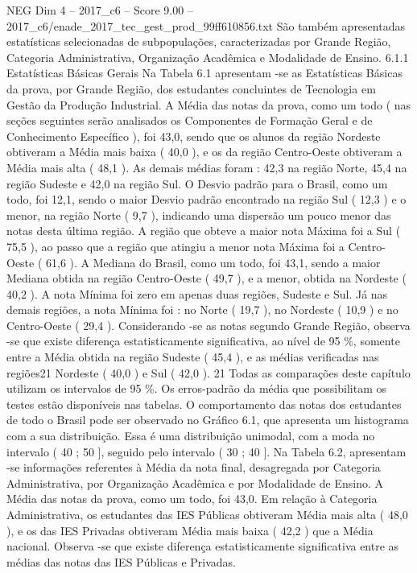 \begin{textsample}{NEG Dim 4 – 2017\_c6 – Score 9.00 – 2017\_c6/enade\_2017\_tec\_gest\_prod\_99ff610856.txt}
São também apresentadas estatísticas selecionadas de subpopulações, caracterizadas por Grande Região, Categoria Administrativa, Organização Acadêmica e Modalidade de Ensino. 6.1.1 Estatísticas Básicas Gerais Na Tabela 6.1 apresentam -se as Estatísticas Básicas da prova, por Grande Região, dos estudantes concluintes de Tecnologia em Gestão da Produção Industrial.
A Média das notas da prova, como um todo ( nas seções seguintes serão analisados os Componentes de Formação Geral e de Conhecimento Específico ), foi 43,0, sendo que os alunos da região Nordeste obtiveram a Média mais baixa ( 40,0 ), e os da região Centro-Oeste obtiveram a Média mais alta ( 48,1 ).
As demais médias foram : 42,3 na região Norte, 45,4 na região Sudeste e 42,0 na região Sul.
O Desvio padrão para o Brasil, como um todo, foi 12,1, sendo o maior Desvio padrão encontrado na região Sul ( 12,3 ) e o menor, na região Norte ( 9,7 ), indicando uma dispersão um pouco menor das notas desta última região.
A região que obteve a maior nota Máxima foi a Sul ( 75,5 ), ao passo que a região que atingiu a menor nota Máxima foi a Centro-Oeste ( 61,6 ).
A Mediana do Brasil, como um todo, foi 43,1, sendo a maior Mediana obtida na região Centro-Oeste ( 49,7 ), e a menor, obtida na Nordeste ( 40,2 ).
A nota Mínima foi zero em apenas duas regiões, Sudeste e Sul.
Já nas demais regiões, a nota Mínima foi : no Norte ( 19,7 ), no Nordeste ( 10,9 ) e no Centro-Oeste ( 29,4 ).
Considerando -se as notas segundo Grande Região, observa -se que existe diferença estatisticamente significativa, ao nível de 95 \%, somente entre a Média obtida na região Sudeste ( 45,4 ), e as médias verificadas nas regiões21 Nordeste ( 40,0 ) e Sul ( 42,0 ). 21 Todas as comparações deste capítulo utilizam os intervalos de 95 \%.
Os erros-padrão da média que possibilitam os testes estão disponíveis nas tabelas.
O comportamento das notas dos estudantes de todo o Brasil pode ser observado no Gráfico 6.1, que apresenta um histograma com a sua distribuição.
Essa é uma distribuição unimodal, com a moda no intervalo ( 40 ; 50 ], seguido pelo intervalo ( 30 ; 40 ].
Na Tabela 6.2, apresentam -se informações referentes à Média da nota final, desagregada por Categoria Administrativa, por Organização Acadêmica e por Modalidade de Ensino.
A Média das notas da prova, como um todo, foi 43,0.
Em relação à Categoria Administrativa, os estudantes das IES Públicas obtiveram Média mais alta ( 48,0 ), e os das IES Privadas obtiveram Média mais baixa ( 42,2 ) que a Média nacional.
Observa -se que existe diferença estatisticamente significativa entre as médias das notas das IES Públicas e Privadas.

\end{textsample}
